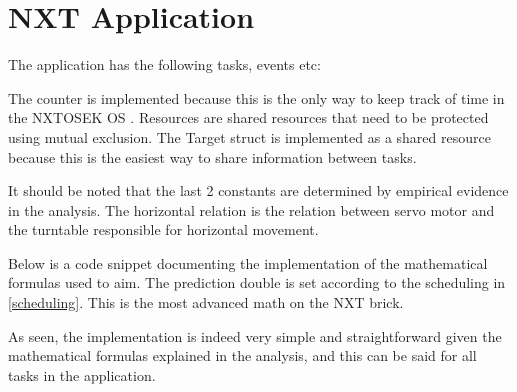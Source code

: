 \section{NXT Application}
The application has the following tasks, events etc:



The counter is implemented because this is the only way to keep track of time in the NXTOSEK OS \cite{osek_spec}.
Resources are shared resources that need to be protected using mutual exclusion. The Target struct is implemented as a shared resource because this is the easiest way to share information between tasks.

It should be noted that the last 2 constants are determined by empirical evidence in the analysis. The horizontal relation is the relation between servo motor and the turntable responsible for horizontal movement.

Below is a code snippet documenting the implementation of the mathematical formulas used to aim. The prediction double is set according to the scheduling in \autoref{scheduling}. This is the most advanced math on the NXT brick.



As seen, the implementation is indeed very simple and straightforward given the mathematical formulas explained in the analysis, and this can be said for all tasks in the application. 
